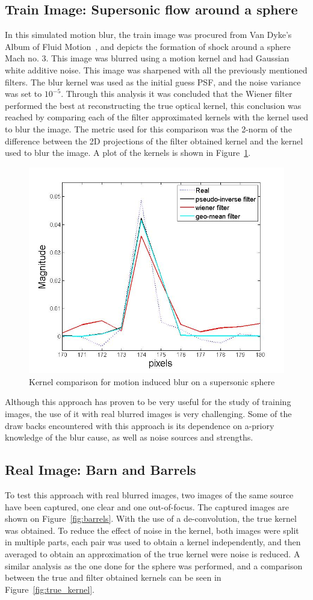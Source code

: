\subsection{Train Image: Supersonic flow around a sphere}
In this simulated motion blur, the train image was procured from Van Dyke's Album of Fluid Motion~\cite{VanDyke:1982}, and depicts the formation of shock around a sphere Mach no. 3. This image was blurred using a motion kernel and had Gaussian white additive noise. This image was sharpened with all the previously mentioned filters. The blur kernel was used as the initial guess PSF, and the noise variance was set to $10^{-5}$. 
Through this analysis it was concluded that the Wiener filter performed the best at reconstructing the true optical kernel, this conclusion was reached by comparing each of the filter approximated kernels with the kernel used to blur the image. The metric used for this comparison was the 2-norm of the difference between the 2D projections of the filter obtained kernel and the kernel used to blur the image. A plot of the kernels is shown in Figure~\ref{fig:sph_kernels}.

\begin{figure}[h!]
  \centering
                \centering
                \includegraphics[width=.4\textwidth]{kernel_motion.jpg}
                \caption{Kernel comparison for motion induced blur on a supersonic sphere}
 \label{fig:sph_kernels}
\end{figure}

Although this approach has proven to be very useful for the study of training images, the use of it with real blurred images is very challenging. Some of the draw backs encountered with this approach is its dependence on a-priory knowledge of the blur cause, as well as noise sources and strengths. 

\subsection{Real Image: Barn and Barrels}

To test this approach with real blurred images, two images of the same source have been captured, one clear and one out-of-focus. The captured images are shown on Figure~\ref{fig:barrels}. With the use of a de-convolution, the true kernel was obtained. To reduce the effect of noise in the kernel, both images were split in multiple parts, each pair was used to obtain a kernel independently, and then averaged to obtain an approximation of the true kernel were noise is reduced. A similar analysis as the one done for the sphere was performed, and a comparison between the true and filter obtained kernels can be seen in Figure~\ref{fig:true_kernel}.

